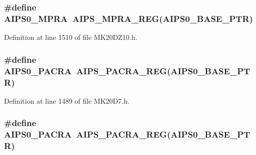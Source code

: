\subsubsection[{\texorpdfstring{A\+I\+P\+S0\+\_\+\+M\+P\+RA}{AIPS0_MPRA}}]{\setlength{\rightskip}{0pt plus 5cm}\#define A\+I\+P\+S0\+\_\+\+M\+P\+RA~{\bf A\+I\+P\+S\+\_\+\+M\+P\+R\+A\+\_\+\+R\+EG}({\bf A\+I\+P\+S0\+\_\+\+B\+A\+S\+E\+\_\+\+P\+TR})}\hypertarget{group___a_i_p_s___register___accessor___macros_ga41bb0ce77a71c841504362985bac06d6}{}\label{group___a_i_p_s___register___accessor___macros_ga41bb0ce77a71c841504362985bac06d6}


Definition at line 1510 of file M\+K20\+D\+Z10.\+h.

\subsubsection[{\texorpdfstring{A\+I\+P\+S0\+\_\+\+P\+A\+C\+RA}{AIPS0_PACRA}}]{\setlength{\rightskip}{0pt plus 5cm}\#define A\+I\+P\+S0\+\_\+\+P\+A\+C\+RA~{\bf A\+I\+P\+S\+\_\+\+P\+A\+C\+R\+A\+\_\+\+R\+EG}({\bf A\+I\+P\+S0\+\_\+\+B\+A\+S\+E\+\_\+\+P\+TR})}\hypertarget{group___a_i_p_s___register___accessor___macros_ga6567afc8512229ae0e8fa1c13de5e80d}{}\label{group___a_i_p_s___register___accessor___macros_ga6567afc8512229ae0e8fa1c13de5e80d}


Definition at line 1489 of file M\+K20\+D7.\+h.

\subsubsection[{\texorpdfstring{A\+I\+P\+S0\+\_\+\+P\+A\+C\+RA}{AIPS0_PACRA}}]{\setlength{\rightskip}{0pt plus 5cm}\#define A\+I\+P\+S0\+\_\+\+P\+A\+C\+RA~{\bf A\+I\+P\+S\+\_\+\+P\+A\+C\+R\+A\+\_\+\+R\+EG}({\bf A\+I\+P\+S0\+\_\+\+B\+A\+S\+E\+\_\+\+P\+TR})}\hypertarget{group___a_i_p_s___register___accessor___macros_ga6567afc8512229ae0e8fa1c13de5e80d}{}\label{group___a_i_p_s___register___accessor___macros_ga6567afc8512229ae0e8fa1c13de5e80d}


